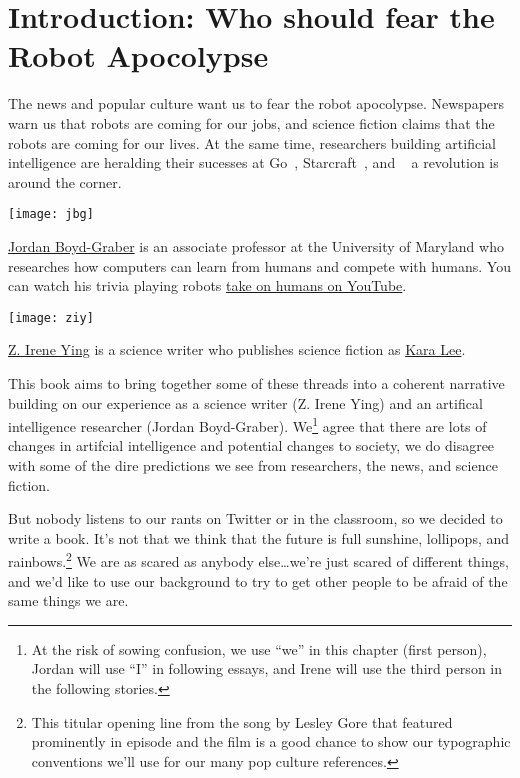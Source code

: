 \cleardoublepage
\chapter{Introduction: Who should fear the Robot Apocolypse}

The news and popular culture want us to fear the robot apocolypse.  Newspapers warn us that robots are coming for our jobs, and science fiction claims that the robots are coming for our lives.  At the same time, researchers building artificial intelligence are heralding their sucesses at Go~\cite{silver-16}, Starcraft~\cite{vinyals2017starcraft}, and ~\cite{ferruci-10} a revolution is around the corner.

\begin{marginfigure}%
  \texttt{[image: jbg]}
  \caption{\href{http://boydgraber.org}{Jordan Boyd-Graber} is an associate professor at the University of Maryland who researches how computers can learn from humans and compete with humans.  You can watch his trivia playing robots \href{http://qanta.org/home/past-events}{take on humans on YouTube}.}
  \label{fig:marginfig}
\end{marginfigure}

\begin{marginfigure}%
  \texttt{[image: ziy]}
  \caption{\href{http://www.ireneying.net/}{Z. Irene Ying} is a science writer who publishes science fiction as \href{http://www.windupdreams.net/}{Kara Lee}.}
  \label{fig:marginfig}
\end{marginfigure}

This book aims to bring together some of these threads into a coherent
narrative building on our experience as a science writer (Z. Irene
Ying) and an artifical intelligence researcher (Jordan Boyd-Graber).
We\footnote{At the risk of sowing confusion, we use ``we'' in this
chapter (first person), Jordan will use ``I'' in following essays, and
Irene will use the third person in the following stories.} agree that
there are lots of changes in artifcial intelligence and potential
changes to society, we do disagree with some of the dire predictions
we see from researchers, the news, and science fiction.

But nobody listens to our rants on Twitter or in the classroom, so we
decided to write a book.  It's not that we think that the future is
full sunshine, lollipops, and rainbows.\footnote{This titular opening
line from the song  by Lesley
Gore that featured prominently in 
episode  and the film  is a good chance to show our typographic
conventions we'll use for our many pop culture references.}  We are as
scared as anybody else\dots we're just scared of different things, and
we'd like to use our background to try to get other people to be
afraid of the same things we are.

